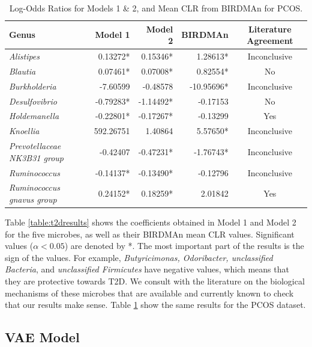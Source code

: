 \documentclass[12pt,letterpaper]{article}
\begin{document}
      \begin{table}
        \centering
        \begin{tabular}{l r r r c}
          \toprule
          \textbf{Genus} & \textbf{Model 1} & \textbf{Model 2} & \textbf{BIRDMAn} & \textbf{Literature Agreement} \\
          \midrule
          \textit{Alistipes} & 0.13272* & 0.15346* & 1.28613* & Inconclusive \\
          \textit{Blautia} & 0.07461* & 0.07008* & 0.82554* & No \\
          \textit{Burkholderia} & -7.60599 & -0.48578 & -10.95696* & Inconclusive \\
          \textit{Desulfovibrio} & -0.79283* & -1.14492* & -0.17153 & No \\
          \textit{Holdemanella} & -0.22801* & -0.17267* & -0.13299 & Yes \\
          \textit{Knoellia} & 592.26751 & 1.40864 & 5.57650* & Inconclusive \\
          \textit{Prevotellaceae NK3B31 group} & -0.42407 & -0.47231* & -1.76743* & Inconclusive \\
          \textit{Ruminococcus} & -0.14137* & -0.13490* & -0.12796 & Inconclusive \\
          \textit{Ruminococcus gnavus group} & 0.24152* & 0.18259* & 2.01842 & Yes \\
          \bottomrule
        \end{tabular}
        \caption{Log-Odds Ratios for Models 1 \& 2, and Mean CLR from BIRDMAn for PCOS.}
        \label{table:pcosresults}
      \end{table}

Table \ref{table:t2dresults} shows the coefficients obtained in Model 1 and Model 2 for the five microbes, as well as their BIRDMAn mean CLR values. Significant values ($\alpha < 0.05$) are denoted by *. The most important part of the results is the sign of the values. For example, \textit{Butyricimonas, Odoribacter, unclassified Bacteria}, and \textit{unclassified Firmicutes} have negative values, which means that they are protective towards T2D. We consult with the literature on the biological mechanisms of these microbes that are available and currently known to check that our results make sense. Table \ref{table:pcosresults} show the same results for the PCOS dataset. 

\subsection{VAE Model}
\end{document}
